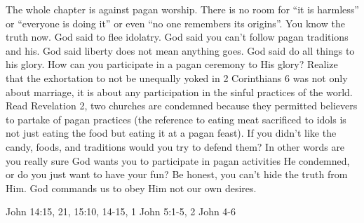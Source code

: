 The whole chapter is against pagan worship.  There is no room for ``it is harmless'' or ``everyone is doing it'' or even ``no one remembers its origins''.  You know the truth now.  God said to flee idolatry.  God said you can't follow pagan traditions and his.  God said liberty does not mean anything goes.  God said do all things to his glory.  How can you participate in a pagan ceremony to His glory?  Realize that the exhortation to not be unequally yoked in 2 Corinthians 6 was not only about marriage, it is about any participation in the sinful practices of the world.  Read Revelation 2, two churches are condemned because they permitted believers to partake of pagan practices (the reference to eating meat sacrificed to idols is not just eating the food but eating it at a pagan feast).  If you didn't like the candy, foods, and traditions would you try to defend them?  In other words are you really sure God wants you to participate in pagan activities He condemned, or do you just want to have your fun?  Be honest, you can't hide the truth from Him.  God commands us to obey Him not our own desires.


John 14:15, 21, 15:10, 14-15, 1 John 5:1-5, 2 John 4-6
